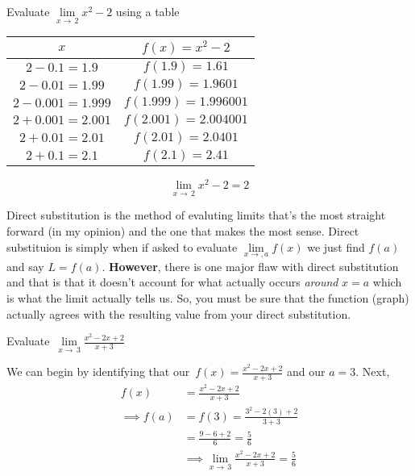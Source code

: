 \documentclass[addpoints]{exam}
\begin{document}
  \begin{questions}
    \question Evaluate $\lim\limits_{x\to\,2} x^2 - 2$ using a table
    \begin{solution}[2.5in]
      \begin{minipage}{0.45\linewidth}
        \begin{tabular}{|c|c|}
          \hline
          $x$ & $f(x)=x^2-2$ \\
          \hline
          $2-0.1 = 1.9$ & $f(1.9) = 1.61$ \\
          \hline
          $2-0.01 = 1.99$ & $f(1.99) = 1.9601$ \\
          \hline
          $2-0.001 = 1.999$ & $f(1.999) = 1.996001$ \\
          \hline
          $2 + 0.001 = 2.001$ & $f(2.001) = 2.004001$ \\
          \hline
          $2 + 0.01 = 2.01$ & $f(2.01) = 2.0401$ \\
          \hline
          $2 + 0.1 = 2.1$ & $f(2.1) = 2.41$ \\
          \hline
        \end{tabular}
      \end{minipage}
      \hfill
      \begin{minipage}{0.45\linewidth}
        \[\boxed{\lim\limits_{x\to\,2}x^2-2=2}\]
      \end{minipage}
    \end{solution}
  \end{questions}
  \begin{tcolorbox}[breakable, title=DIRECT SUBSTITUTION, colframe=black, sharp corners, colback=white, colbacktitle=white, coltitle=black]
    Direct substitution is the method of evaluting limits that's the most straight forward (in my opinion) and the one that makes the most sense. Direct substituion is simply when if asked to evaluate $\lim\limits_{x\to,a} f(x)$ we just find $f(a)$ and say $L=f(a)$. \textbf{However}, there is one major flaw with direct substitution and that is that it doesn't account for what actually occurs \textit{around} $x=a$ which is what the limit actually tells us. So, you must be sure that the function (graph) actually agrees with the resulting value from your direct substitution.
  \end{tcolorbox}
  \begin{questions}
    \question Evaluate $\displaystyle\,\lim\limits_{x\to\,3} \frac{x^2-2x+2}{x+3}$ 
    \begin{solution}[2.5in]
      We can begin by identifying that our $\displaystyle\, f(x)=\frac{x^2-2x+2}{x+3}$ and our $a=3$. Next,
      \begin{align*}
        f(x) &= \frac{x^2-2x+2}{x+3} \\
        \implies f(a) &= f(3) = \frac{3^2-2(3)+2}{3+3} \\ 
        &= \frac{9-6+2}{6} = \frac{5}{6} \\ 
        &\implies \boxed{\lim\limits_{x\to\,3} \frac{x^2-2x+2}{x+3} = \frac{5}{6}}
      \end{align*}
    \end{solution}
  \end{questions}
\end{document}
